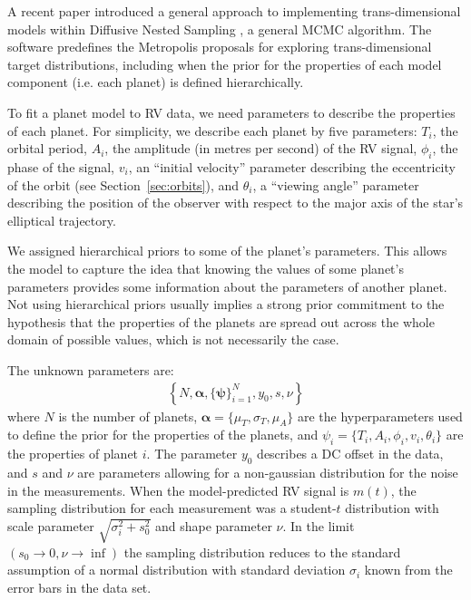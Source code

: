 \documentclass[useAMS,usenatbib]{mn2e}
\begin{document}
A recent paper \citep{rjobject} introduced a general approach to implementing
trans-dimensional models within Diffusive Nested Sampling \citep{dnest}, a
general MCMC algorithm. The \citet{rjobject} software predefines the
Metropolis proposals for exploring trans-dimensional target distributions,
including when the prior for the properties of each model component (i.e. each
planet) is defined hierarchically.

To fit a planet model to RV data, we need parameters to describe
the properties of each planet. For simplicity, we describe each planet by
five parameters: $T_i$, the orbital period, $A_i$, the amplitude (in metres
per second) of the RV signal, $\phi_i$, the phase of the signal, $v_i$, an
``initial velocity'' parameter describing the eccentricity of the orbit
(see Section~\ref{sec:orbits}), and $\theta_i$, a ``viewing angle'' parameter
describing the position of the observer with respect to the major axis of the
star's elliptical trajectory.

We assigned hierarchical priors to some of the planet's parameters. This allows the
model to capture the idea that knowing the values of some planet's parameters
provides some information about the parameters of another planet. Not using
hierarchical priors usually implies a strong prior commitment to the hypothesis
that the properties of the planets are spread out across the whole domain of
possible values, which is not necessarily the case.

The unknown parameters are:
\begin{eqnarray}
\left\{N, \boldsymbol{\alpha}, \{\boldsymbol{\psi}\}_{i=1}^N, y_0, s, \nu\right\}
\end{eqnarray}
where $N$ is the number of planets,
$\boldsymbol{\alpha} = \{\mu_T, \sigma_T, \mu_A\}$ are the
hyperparameters used to define the prior for the properties of the planets,
and $\psi_i = \{T_i, A_i, \phi_i, v_i, \theta_i\}$
are the properties of planet $i$.
The parameter $y_0$ describes a DC offset in the data, and $s$ and $\nu$ are
parameters allowing for a non-gaussian distribution for the noise in the
measurements. When the model-predicted RV signal is $m(t)$, the sampling
distribution for each measurement was a student-$t$ distribution with
scale parameter $\sqrt{\sigma_i^2 + s_0^2}$ and shape parameter $\nu$. In the limit
$(s_0 \to 0, \nu \to \inf)$ the sampling distribution reduces to the standard
assumption of a normal distribution with standard deviation $\sigma_i$ known
from the error bars in the data set.
\end{document}
